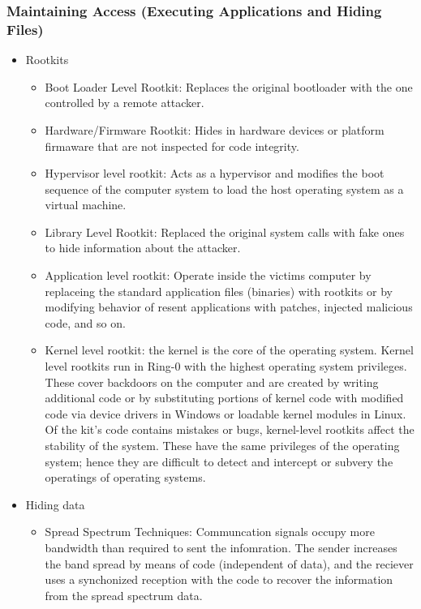 \subsubsection{Maintaining Access (Executing Applications and Hiding Files)}
\begin{itemize}
    \item Rootkits
    \begin{itemize}
        \item Boot Loader Level Rootkit: Replaces the original bootloader with the one controlled by a remote attacker.
        \item Hardware/Firmware Rootkit: Hides in hardware devices or platform firmaware that are not inspected for code integrity.
        \item Hypervisor level rootkit: Acts as a hypervisor and modifies the boot sequence of the computer system to load the host operating system as a virtual machine.
        \item Library Level Rootkit: Replaced the original system calls with fake ones to hide information about the attacker.
        \item Application level rootkit: Operate inside the victims computer by replaceing the standard application files (binaries) with rootkits or by modifying behavior of resent applications with patches, injected malicious code, and so on.
        \item Kernel level rootkit: the kernel is the core of the operating system. Kernel level rootkits run in Ring-0 with the highest operating system privileges. These cover backdoors on the computer and are created by writing additional code or by substituting portions of kernel code with modified code via device drivers in Windows or loadable kernel modules in Linux. Of the kit's code contains mistakes or bugs, kernel-level rootkits affect the stability of the system. These have the same privileges of the operating system; hence they are difficult to detect and intercept or subvery the operatings of operating systems.
    \end{itemize}
    \item Hiding data
    \begin{itemize}
        \item Spread Spectrum Techniques: Communcation signals occupy more bandwidth than required to sent the infomration. The sender increases the band spread by means of code (independent of data), and the reciever uses a synchonized reception with the code to recover the information from the spread spectrum data.

\end{itemize}
\end{itemize}
